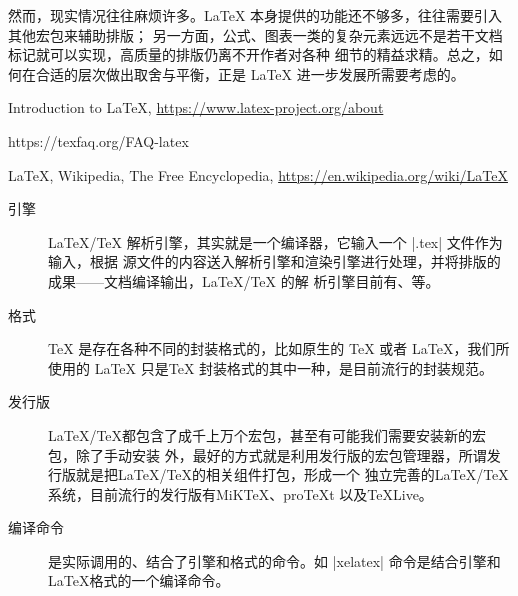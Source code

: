 然而，现实情况往往麻烦许多。\LaTeX{} 本身提供的功能还不够多，往往需要引入其他宏包来辅助排版；
另一方面，公式、图表一类的复杂元素远远不是若干文档标记就可以实现，高质量的排版仍离不开作者对各种
细节的精益求精。总之，如何在合适的层次做出取舍与平衡，正是 \LaTeX{} 进一步发展所需要考虑的。

\begin{reference}
  \item Introduction to \LaTeX{}, \url{https://www.latex-project.org/about}
  \item https://texfaq.org/FAQ-latex
  \item \LaTeX{}, Wikipedia, The Free Encyclopedia, \url{https://en.wikipedia.org/wiki/LaTeX}
\end{reference}



\begin{description}
  \item[引擎] \LaTeX{}/\TeX{} 解析引擎，其实就是一个编译器，它输入一个 |.tex| 文件作为输入，根据
  源文件的内容送入解析引擎和渲染引擎进行处理，并将排版的成果——文档编译输出，\LaTeX{}/\TeX{} 的解
  析引擎目前有\pdfTeX{}、\XeLaTeX{}等。
  \item[格式] \TeX{} 是存在各种不同的封装格式的，比如原生的 \TeX{} 或者 \LaTeX{}，我们所使用的
    \LaTeX{} 只是\TeX{} 封装格式的其中一种，是目前流行的封装规范。
  \item[发行版] \LaTeX/\TeX{}都包含了成千上万个宏包，甚至有可能我们需要安装新的宏包，除了手动安装
    外，最好的方式就是利用发行版的宏包管理器，所谓发行版就是把\LaTeX/\TeX{}的相关组件打包，形成一个
    独立完善的\LaTeX/\TeX{}系统，目前流行的发行版有MiKTeX、proTeXt 以及TeXLive。
  \item[编译命令] 是实际调用的、结合了引擎和格式的命令。如 |xelatex| 命令是结合\XeTeX{}引擎和
  \LaTeX{}格式的一个编译命令。
\end{description}


